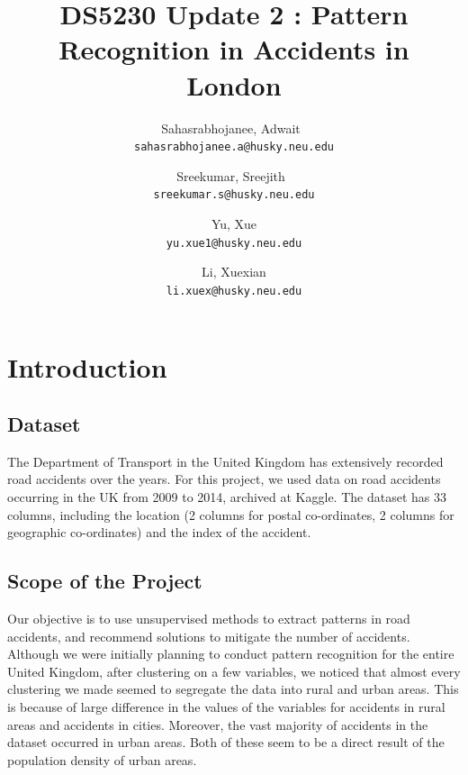 \documentclass[a4paper, 11pt]{article}
\begin{document}
\title{DS5230 Update 2 : Pattern Recognition in Accidents in London}


\author{
  Sahasrabhojanee, Adwait\ \\     \texttt{sahasrabhojanee.a@husky.neu.edu}
  \and
  Sreekumar, Sreejith\  \\ \texttt{sreekumar.s@husky.neu.edu}
  \and
  Yu, Xue \\  \texttt{yu.xue1@husky.neu.edu}
  \and
  Li, Xuexian  \\ \texttt{li.xuex@husky.neu.edu}
}
\maketitle

\section{Introduction}

\subsection{Dataset}
The Department of Transport in the United Kingdom has extensively recorded road accidents over the years. For this project, we used data on road accidents occurring in the UK from 2009 to 2014, archived at Kaggle. The dataset has 33 columns, including the location (2 columns for postal co-ordinates, 2 columns for geographic co-ordinates) and the index of the accident. 

\subsection{Scope of the Project}

Our objective is to use unsupervised methods to extract patterns in road accidents, and recommend solutions to mitigate the number of accidents. \\ 

Although we were initially planning to conduct pattern recognition for the entire United Kingdom, after clustering on a few variables, we noticed that almost every clustering we made seemed to segregate the data into rural and urban areas. This is because of large difference in the values of the variables for accidents in rural areas and accidents in cities. Moreover, the vast majority of accidents in the dataset occurred in urban areas. Both of these seem to be a direct result of the population density of urban areas. \\ 
\end{document}
